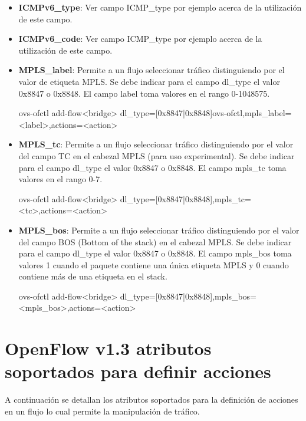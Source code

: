 \begin{itemize}
\item \textbf{ICMPv6\_type}: Ver campo ICMP\_type por ejemplo acerca de la utilización de este campo. 

\item \textbf{ICMPv6\_code}: Ver campo ICMP\_type por ejemplo acerca de la utilización de este campo. 

\item \textbf{MPLS\_label}:  Permite a un flujo seleccionar tr\'afico distinguiendo por el valor de etiqueta MPLS. Se debe indicar para el campo dl\_type el valor 0x8847 o 0x8848. El campo label toma valores en el rango 0-1048575.

\begin{center}
ovs-ofctl add-flow<bridge> dl\_type=[0x8847|0x8848]ovs-ofctl,mpls\_label=<label>,actions=<action>
\end{center}

\item \textbf{MPLS\_tc}: Permite a un flujo seleccionar tr\'afico distinguiendo por el valor del campo TC en el cabezal MPLS (para uso experimental). Se debe indicar para el campo dl\_type el valor 0x8847 o 0x8848. El campo mpls\_tc toma valores en el rango 0-7.

\begin{center}
ovs-ofctl add-flow<bridge> dl\_type=[0x8847|0x8848],mpls\_tc=<tc>,actions=<action>
\end{center}

\item \textbf{MPLS\_bos}: Permite a un flujo seleccionar tr\'afico distinguiendo por el valor del campo BOS (Bottom of the stack) en el cabezal MPLS. Se debe indicar para el campo dl\_type el valor 0x8847 o 0x8848. El campo mpls\_bos toma valores 1 cuando el paquete contiene una única etiqueta MPLS y 0 cuando contiene m\'as de una etiqueta en el stack.

\begin{center}
ovs-ofctl add-flow<bridge> dl\_type=[0x8847|0x8848],mpls\_bos=<mpls\_bos>,actions=<action>
\end{center}

\end{itemize}

\section{OpenFlow v1.3 atributos soportados para definir acciones}
A continuaci\'on se detallan los atributos soportados para la definici\'on de acciones en un flujo lo cual permite la manipulaci\'on de tr\'afico.

